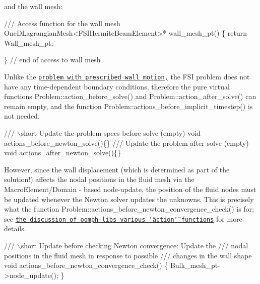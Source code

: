 and the wall mesh\+:


\begin{DoxyCodeInclude}
 \textcolor{comment}{/// Access function for the wall mesh}
 OneDLagrangianMesh<FSIHermiteBeamElement>* wall\_mesh\_pt() 
  \{
   \textcolor{keywordflow}{return} Wall\_mesh\_pt;

  \} \textcolor{comment}{// end of access to wall mesh}

\end{DoxyCodeInclude}


Unlike the \href{../../../navier_stokes/collapsible_channel/html/index.html}{\tt problem with prescribed wall motion,} the F\+SI problem does not have any time-\/dependent boundary conditions, therefore the pure virtual functions {\ttfamily Problem\+::action\+\_\+before\+\_\+solve()} and {\ttfamily Problem\+::action\+\_\+after\+\_\+solve()} can remain empty, and the function {\ttfamily Problem\+::actions\+\_\+before\+\_\+implicit\+\_\+timestep()} is not needed.


\begin{DoxyCodeInclude}

\textcolor{comment}{}
\textcolor{comment}{ /// \(\backslash\)short Update the problem specs before solve (empty) }
\textcolor{comment}{} \textcolor{keywordtype}{void} actions\_before\_newton\_solve()\{\}
\textcolor{comment}{}
\textcolor{comment}{ /// Update the problem after solve (empty)}
\textcolor{comment}{} \textcolor{keywordtype}{void} actions\_after\_newton\_solve()\{\}

\end{DoxyCodeInclude}


However, since the wall displacement (which is determined as part of the solution!) affects the nodal positions in the fluid mesh via the {\ttfamily Macro\+Element/{\ttfamily Domain} -\/} based node-\/update, the position of the fluid nodes must be updated whenever the Newton solver updates the unknowns. This is precisely what the function {\ttfamily Problem\+::actions\+\_\+before\+\_\+newton\+\_\+convergence\+\_\+check()} is for; see \href{../../../order_of_action_functions/html/index.html}{\tt the discussion of {\ttfamily oomph-\/lib\textquotesingle{}s} various \char`\"{}action\char`\"{} functions} for more details.


\begin{DoxyCodeInclude}
  \textcolor{comment}{}
\textcolor{comment}{ /// \(\backslash\)short Update before checking Newton convergence: Update the}
\textcolor{comment}{ /// nodal positions in the fluid mesh in response to possible }
\textcolor{comment}{ /// changes in the wall shape}
\textcolor{comment}{} \textcolor{keywordtype}{void} actions\_before\_newton\_convergence\_check()
  \{
   Bulk\_mesh\_pt->node\_update();
  \}

\end{DoxyCodeInclude}


